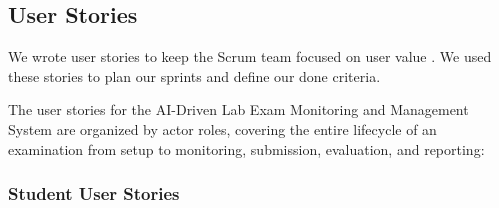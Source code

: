 \subsection{User Stories}

We wrote user stories to keep the Scrum team focused on user value \cite{user_stories_applied}. We used these stories to plan our sprints and define our done criteria.

The user stories for the AI-Driven Lab Exam Monitoring and Management System are organized by actor roles, covering the entire lifecycle of an examination from setup to monitoring, submission, evaluation, and reporting:

\subsubsection{Student User Stories}
